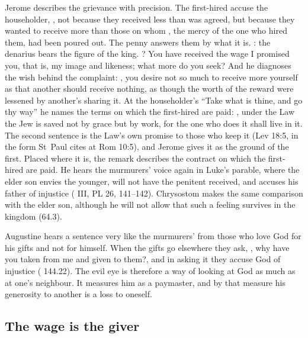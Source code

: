Jerome describes the grievance with precision. The first-hired accuse the
householder, , not
because they received less than was agreed, but because they wanted to
receive more than those on whom , the mercy of
the one who hired them, had been poured out. The penny answers them by what
it is. : the denarius bears the figure of
the king. ? You have received the
wage I promised you, that is, my image and likeness; what more do you seek?
And he diagnoses the wish behind the complaint: , you desire not so much to receive more yourself as that another
should receive nothing, as though the worth of the reward were lessened by
another's sharing it. At the householder's ``Take what is thine, and go thy
way'' he names the terms on which the first-hired are paid: , under
the Law the Jew is saved not by grace but by work, for the one who does it
shall live in it. The second sentence is the Law's own promise to those who
keep it (Lev 18:5, in the form St~Paul cites at Rom 10:5), and Jerome gives it
as the ground of the first. Placed where it is, the remark describes the
contract on which the first-hired are paid. He hears the murmurers' voice
again in Luke's parable, where the elder son envies the younger, will not have
the penitent received, and accuses his father of injustice
( III, PL 26, 141--142). Chrysostom makes the
same comparison with the elder son, although he will not allow that such a
feeling survives in the kingdom (64.3).

Augustine hears a sentence very like the murmurers' from those who love God
for his gifts and not for himself. When the gifts go elsewhere they ask,
, why have you taken from me
and given to them?, and in asking it they accuse God of injustice
( 144.22). The evil eye is therefore a way of
looking at God as much as at one's neighbour. It measures him as a paymaster,
and by that measure his generosity to another is a loss to oneself.

\subsection{The wage is the giver}

